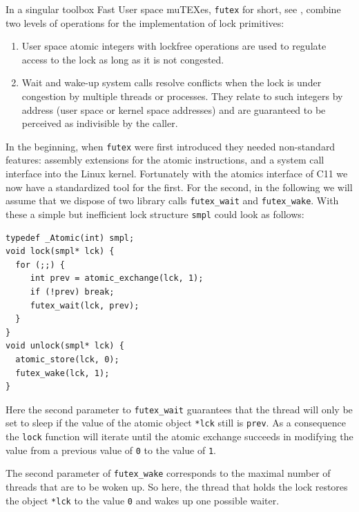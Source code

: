 \documentclass{sig-alternate-05-2015}
\begin{document}
In a singular toolbox Fast User space muTEXes, \texttt{futex} for short,
see \cite{Hutton02fuss,hart09}, combine two levels of operations
for the implementation of lock primitives:\vspace*{-2ex}

\begin{enumerate}
\item User space atomic integers with lockfree operations are used to
regulate access to the lock as long as it is not congested.\vspace*{-2ex}

\item Wait and wake-up system calls resolve conflicts when the lock is
under congestion by multiple threads or processes. They relate
to such integers by address (user space or kernel space
addresses) and are guaranteed to be perceived as indivisible by
the caller.\vspace*{-2ex}
\end{enumerate}

In the beginning, when \texttt{futex} were first introduced they needed
non-standard features: assembly extensions for the atomic
instructions, and a system call interface into the Linux
kernel. Fortunately with the atomics interface of C11 we now have
a standardized tool for the first. For the second, in the
following we will assume that we dispose of two library calls
\texttt{futex\_wait} and \texttt{futex\_wake}. With these a simple but
inefficient lock structure \texttt{smpl} could look as follows:

\lstset{language=C11,label= ,caption= ,numbers=none}
\begin{lstlisting}
typedef _Atomic(int) smpl;
void lock(smpl* lck) {
  for (;;) {
     int prev = atomic_exchange(lck, 1);
     if (!prev) break;
     futex_wait(lck, prev);
  }
}
void unlock(smpl* lck) {
  atomic_store(lck, 0);
  futex_wake(lck, 1);
}
\end{lstlisting}

Here the second parameter to \texttt{futex\_wait} guarantees that the thread
will only be set to sleep if the value of the atomic object \texttt{*lck}
still is \texttt{prev}. As a consequence the \texttt{lock} function will iterate until the
atomic exchange succeeds in modifying the value from a previous
value of \texttt{0} to the value of \texttt{1}.

The second parameter of \texttt{futex\_wake} corresponds to the maximal
number of threads that are to be woken up. So here, the thread that
holds the lock restores the object \texttt{*lck} to the value \texttt{0} and wakes
up one possible waiter.
\end{document}
